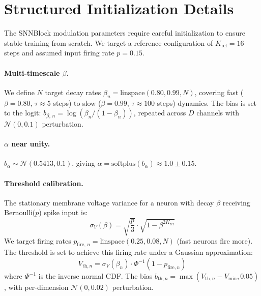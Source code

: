 \documentclass[10pt,twocolumn]{article}
\newcommand{\vmin}{V_{\text{min}}}
\begin{document}




\appendix

\section{Structured Initialization Details}
\label{app:init}

The SNNBlock modulation parameters require careful initialization to ensure stable training from scratch.
We target a reference configuration of $K_{\text{ref}} = 16$ steps and assumed input firing rate $p = 0.15$.

\paragraph{Multi-timescale $\beta$.}
We define $N$ target decay rates $\beta_n = \text{linspace}(0.80, 0.99, N)$, covering fast ($\beta=0.80$, $\tau \approx 5$ steps) to slow ($\beta=0.99$, $\tau \approx 100$ steps) dynamics.
The bias is set to the logit: $b_{\beta,\,n} = \log(\beta_n / (1 - \beta_n))$, repeated across $D$ channels with $\mathcal{N}(0, 0.1)$ perturbation.

\paragraph{$\alpha$ near unity.}
$b_\alpha \sim \mathcal{N}(0.5413, 0.1)$, giving $\alpha = \text{softplus}(b_\alpha) \approx 1.0 \pm 0.15$.

\paragraph{Threshold calibration.}
The stationary membrane voltage variance for a neuron with decay $\beta$ receiving Bernoulli($p$) spike input is:
\begin{equation}
    \sigma_V(\beta) = \sqrt{\frac{p}{3}} \cdot \sqrt{1 - \beta^{2K_{\text{ref}}}}
\end{equation}
We target firing rates $p_{\text{fire},\,n} = \text{linspace}(0.25, 0.08, N)$ (fast neurons fire more).
The threshold is set to achieve this firing rate under a Gaussian approximation:
\begin{equation}
    V_{\text{th},n} = \sigma_V(\beta_n) \cdot \Phi^{-1}(1 - p_{\text{fire},n})
\end{equation}
where $\Phi^{-1}$ is the inverse normal CDF.
The bias $b_{\text{th},n} = \max(V_{\text{th},n} - \vmin, 0.05)$, with per-dimension $\mathcal{N}(0, 0.02)$ perturbation.
\end{document}
